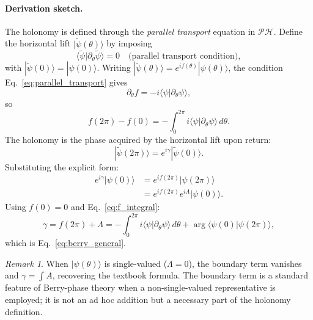 \documentclass[%
 reprint,
 amsmath,amssymb,
 aps,
 prb,
]{revtex4-2}
\numberwithin{equation}{section}
\theoremstyle{definition}
\theoremstyle{remark}
\newtheorem{remark}{Remark}[section]
\begin{document}
\paragraph{Derivation sketch.}
The holonomy is defined through the \emph{parallel transport} equation in $\mathcal{P}\mathcal{H}$.  Define the horizontal lift $|\tilde\psi(\theta)\rangle$ by imposing
\begin{equation}
\langle\tilde\psi|\partial_\theta\tilde\psi\rangle = 0
\quad\text{(parallel transport condition)},
\label{eq:parallel_transport}
\end{equation}
with $|\tilde\psi(0)\rangle = |\psi(0)\rangle$. Writing $|\tilde\psi(\theta)\rangle = e^{if(\theta)}|\psi(\theta)\rangle$, the condition Eq.~\eqref{eq:parallel_transport} gives
\begin{equation}
\partial_\theta f = -i\langle\psi|\partial_\theta\psi\rangle,
\end{equation}
so
\begin{equation}
f(2\pi) - f(0) = -\int_0^{2\pi} i\langle\psi|\partial_\theta\psi\rangle\,d\theta.
\label{eq:f_integral}
\end{equation}
The holonomy is the phase acquired by the horizontal lift upon return:
\begin{equation}
|\tilde\psi(2\pi)\rangle = e^{i\gamma}|\tilde\psi(0)\rangle.
\end{equation}
Substituting the explicit form:
\begin{align}
e^{i\gamma}|\psi(0)\rangle
&= e^{if(2\pi)}|\psi(2\pi)\rangle \nonumber\\
&= e^{if(2\pi)} e^{i\Lambda}|\psi(0)\rangle.
\label{eq:holonomy_derivation}
\end{align}
Using $f(0) = 0$ and Eq.~\eqref{eq:f_integral}:
\begin{equation}
\gamma
= f(2\pi) + \Lambda
= -\int_0^{2\pi} i\langle\psi|\partial_\theta\psi\rangle\,d\theta
  + \arg\langle\psi(0)|\psi(2\pi)\rangle,
\label{eq:gamma_derived}
\end{equation}
which is Eq.~\eqref{eq:berry_general}.

\begin{remark}
When $|\psi(\theta)\rangle$ is single-valued ($\Lambda = 0$), the
boundary term vanishes and $\gamma = \int A$, recovering the textbook
formula.  The boundary term is a standard feature of Berry-phase theory
when a non-single-valued representative is employed; it is not an
ad hoc addition but a necessary part of the holonomy definition.
\end{remark}
\end{document}
